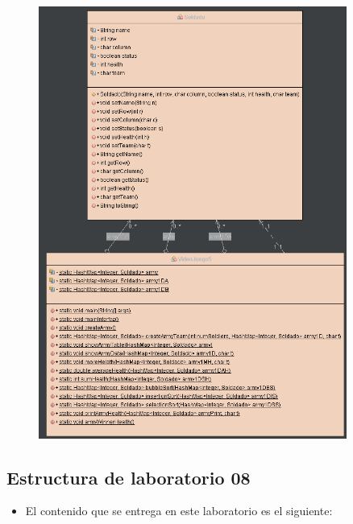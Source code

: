 \documentclass{article}
\begin{document}
        \begin{figure}[H]
            \centering
            \includegraphics[width=0.9\textwidth,keepaspectratio]{img/diagrama08.png}
            \caption{}
        \end{figure}

    \newpage
	\subsection{Estructura de laboratorio 08}
    \begin{itemize}	
		\item El contenido que se entrega en este laboratorio es el siguiente:
	\end{itemize}
	
\end{document}
